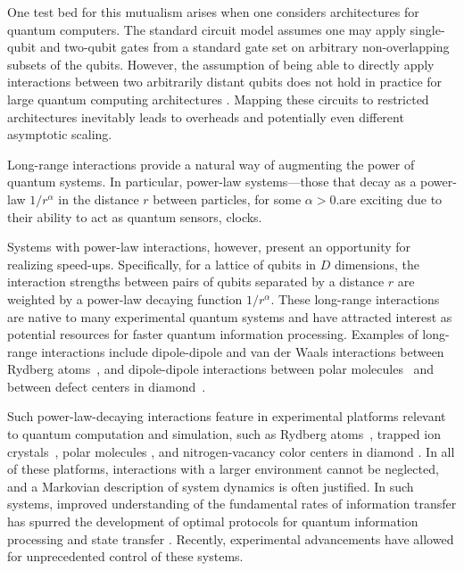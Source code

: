One test bed for this mutualism arises when one considers architectures for quantum computers.
The standard circuit model assumes one may apply single-qubit and two-qubit gates from a standard gate set on arbitrary non-overlapping subsets of the qubits.
However, the assumption of being able to directly apply interactions between two arbitrarily distant qubits does not hold in practice for large quantum computing architectures \cite{Monroe2014,Linke2017,Bapat2018,Childs2019c,Schoute2022}.
Mapping these circuits to restricted architectures inevitably leads to overheads and potentially even different asymptotic scaling.

Long-range interactions provide a natural way of augmenting the power of quantum systems.
In particular, power-law systems---those that decay as a power-law $1/r^\alpha$ in the distance  $r$ between particles, for some $\alpha > 0$.are exciting due to their ability to act as quantum sensors, clocks.



Systems with power-law interactions, however, present an opportunity for realizing speed-ups.
Specifically, for a lattice of qubits in $D$ dimensions, the interaction strengths between pairs of qubits separated by a distance $r$ are weighted by a power-law decaying function $1/r^\alpha$. These long-range interactions are native to many experimental quantum systems and have attracted interest as potential resources for faster quantum information processing. Examples of long-range interactions include dipole-dipole and van der Waals interactions between Rydberg atoms~\cite{Saffman2010,Weimer2012}, and dipole-dipole interactions between polar molecules~\cite{Yan2013} and between defect centers in diamond~\cite{Yao2012,Weimer2012}.

Such power-law-decaying interactions feature in experimental platforms relevant to quantum computation and simulation, such as Rydberg atoms~\cite{Saffman2010}, trapped ion crystals~\cite{Britton2012,Monroe2021}, polar molecules \cite{Yan2013}, and nitrogen-vacancy color centers in diamond \cite{Yao2012}.
In all of these platforms, interactions with a larger environment cannot be neglected, and a Markovian description of system dynamics is often justified.  In such systems, improved understanding of the fundamental rates of information transfer has spurred the development of optimal protocols for quantum information processing and state transfer \cite{Eldredge2017,Tran2021a}.
Recently, experimental advancements have allowed for unprecedented control of these systems.



